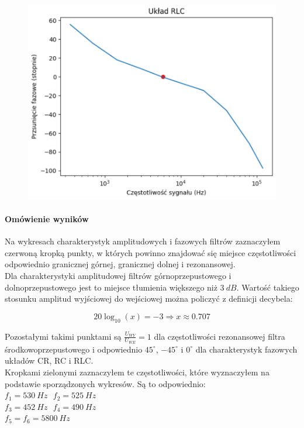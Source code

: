 \documentclass[14pt, table]{extarticle}
\begin{document}
\begin{figure}[H]
\includegraphics[scale=0.7]{D5}
\centering
\captionsetup{labelformat=empty}
\caption{}
\end{figure}

\newpage
\paragraph{Omówienie wyników \\}
Na wykresach charakterystyk amplitudowych i fazowych filtrów zaznaczyłem czerwoną kropką punkty, w których powinno znajdować się miejsce częstotliwości odpowiednio granicznej górnej, granicznej dolnej i rezonansowej. \\

Dla charakterystyki amplitudowej filtrów górnoprzepustowego i dolnoprzepustowego jest to miejsce tłumienia większego niż $3 \ dB$. Wartość takiego stosunku amplitud wyjściowej do wejściowej można policzyć z definicji decybela:

$$ 20 \log_{10}(x) = -3 \Rightarrow x \approx 0.707 $$

Pozostałymi takimi punktami są $\frac{U_{WY}}{U_{WE}} = 1$ dla częstotliwości rezonansowej filtra środkowoprzepustowego i odpowiednio $45^{\circ}$, $-45^{\circ}$ i $0^{\circ}$ dla charakterystyk fazowych układów CR, RC i RLC. \\

Kropkami zielonymi zaznaczyłem te częstotliwości, które wyznaczyłem na podstawie sporządzonych wykresów. Są to odpowiednio: \\
$f_1 = 530 \ Hz \ \ \ f_2 = 525 \ Hz$ \\
$f_3 = 452 \ Hz \ \ \ f_4 = 490 \ Hz$ \\
$f_5 = f_6 = 5800 \ Hz$
\end{document}

